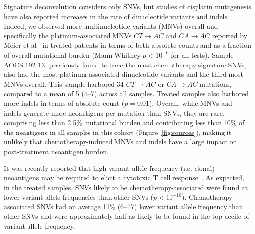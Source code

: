 Signature deconvolution considers only SNVs, but studies of cisplatin mutagenesis have also reported increases in the rate of dinucleotide variants and indels. Indeed, we observed more multinucleotide variants (MNVs) overall and specifically the platinum-associated MNVs $CT \rightarrow AC$ and $CA \rightarrow AC$ reported by Meier et al~\cite{Meier_2014} in treated patients in terms of both absolute counts and as a fraction of overall mutational burden (Mann-Whitney $p < 10^{-6}$ for all tests). Sample AOCS-092-13, previously found to have the most chemotherapy-signature SNVs, also had the most platinum-associated dinucleotide variants and the third-most MNVs overall. This sample harbored 34 $CT \rightarrow AC$ or $CA \rightarrow AC$ mutations, compared to a mean of 5 (4--7) across all samples. Treated samples also harbored more indels in terms of absolute count ($p=0.01$). Overall, while MNVs and indels generate more neoantigens per mutation than SNVs, they are rare, comprising less than 2.5\% mutational burden and contributing less than 10\% of the neantigens in all samples in this cohort (Figure~\ref{fig:sources}), making it unlikely that chemotherapy-induced MNVs and indels have a large impact on post-treatment neoantigen burden.


It was recently reported that high variant-allele frequency (i.e. clonal) neoantigens may be required to elicit a cytotoxic T cell response~\cite{McGranahan_2016}. As expected, in the treated samples, SNVs likely to be chemotherapy-associated were found at lower variant allele frequencies than other SNVs ($p < 10^{-10}$). Chemotherapy-associated SNVs had on average 11\% (6--17) lower variant allele frequency than other SNVs and were approximately half as likely to be found in the top decile of variant allele frequency.


